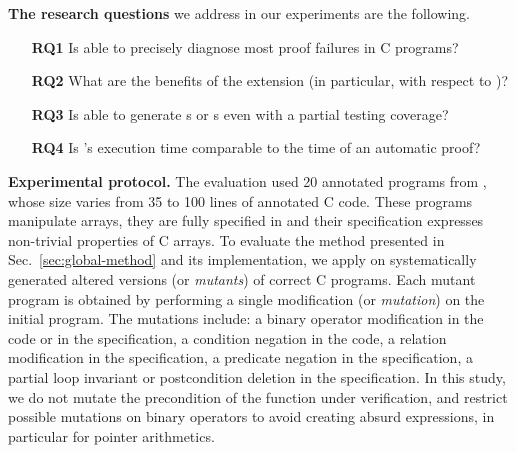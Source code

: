\textbf{The research questions} we address in our experiments are the following.

\vspace{-2mm}
\begin{itemize}
\item[\textbf{RQ1}]
Is \stady able to precisely diagnose most proof failures in C programs?
\item[\textbf{RQ2}]
What are the benefits of the \CWD extension (in particular, with respect to
\NCD)?
\item[\textbf{RQ3}]
Is \stady able to generate  \NCCE{}s or \CWCE{}s even with a partial testing coverage?
\item[\textbf{RQ4}]
Is \stady's execution time comparable to the time of an automatic proof?
\end{itemize}
\vspace{-2mm}



\textbf{Experimental protocol.} 
The evaluation used 20 annotated programs from \cite{ACSLbyExample},
whose size varies from 35 to 100 lines of annotated C code.
These programs manipulate arrays, they are fully specified in \acsl and their
specification expresses non-trivial properties of C arrays. 
To evaluate the method
presented in Sec.~\ref{sec:global-method} and its implementation, we apply \stady on systematically
generated altered  versions (or \emph{mutants}) of correct C programs.
Each mutant program is obtained by performing a single modification (or \emph{mutation}) on the
initial program.
The mutations include: a binary operator modification in the code or in the
specification, a condition negation in the code, a relation modification in the
specification, a predicate negation in the specification, a partial loop invariant or
postcondition deletion in the specification.
In this study, we do not mutate the precondition of the function under verification, 
and restrict possible mutations on binary operators to avoid creating absurd
expressions, in particular for pointer arithmetics.



